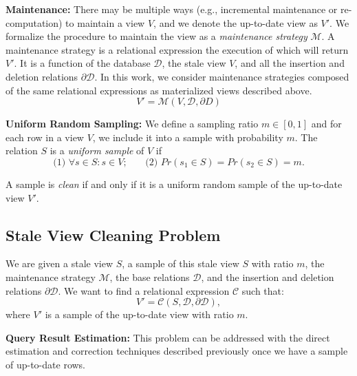 \vspace{0.5em}

\noindent \textbf{Maintenance:} There may be multiple ways (e.g., incremental maintenance or re-computation) to maintain a view $V$, and we denote the up-to-date view as $V'$.
We formalize the procedure to maintain the view as a \emph{maintenance strategy} $\mathcal{M}$.
A maintenance strategy is a relational expression the execution of which will return $V'$.
It is a function of the database $\mathcal{D}$, the stale view $V$, and all the insertion and deletion relations $\partial \mathcal{D}$. 
In this work, we consider maintenance strategies composed of the same relational expressions as materialized views described above.
\[
V' = \mathcal{M}(V,\mathcal{D}, \partial D)
\]

\vspace{0.5em}

\noindent \textbf{Uniform Random Sampling:}
We define a sampling ratio $m\in [0,1]$ and for each row in a view $V$, we include it into a sample with probability $m$.
The relation $S$ is a \emph{uniform sample} of $V$ if
\[\text{(1) } \forall s \in S : s \in V\text{;~~~~~ (2) }Pr(s_1 \in S) =  Pr(s_2 \in S) = m.\]

\vspace{0.5em}

A sample is \emph{clean} if and only if it is a uniform random sample of the up-to-date view $V'$. 

\subsection{Stale View Cleaning Problem}
We are given a stale view $S$, a sample of this stale view $S$ with ratio $m$, the maintenance strategy $\mathcal{M}$, the base relations $\mathcal{D}$, and
the insertion and deletion relations $\partial \mathcal{D}$.
We want to find a relational expression $\mathcal{C}$ such that:
\[
V' = \mathcal{C}(S,\mathcal{D},\partial \mathcal{D}),
\]
where $V'$ is a sample of the up-to-date view with ratio $m$. 

\noindent\textbf{Query Result Estimation: }
This problem can be addressed with the direct estimation and correction techniques 
described previously once we have a sample of up-to-date rows.

